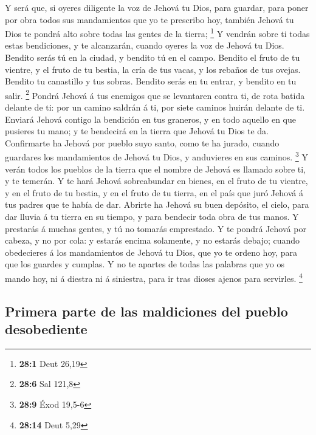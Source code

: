  Y será que, si oyeres diligente la voz de Jehová tu Dios,
para guardar, para poner por obra todos sus mandamientos que yo te
prescribo hoy, también Jehová tu Dios te pondrá alto sobre todas las
gentes de la tierra; \footnote{\textbf{28:1} Deut 26,19} 
Y vendrán sobre ti todas estas bendiciones, y te alcanzarán, cuando
oyeres la voz de Jehová tu Dios.  Bendito serás tú en la
ciudad, y bendito tú en el campo.  Bendito el fruto de tu
vientre, y el fruto de tu bestia, la cría de tus vacas, y los rebaños de
tus ovejas.  Bendito tu canastillo y tus sobras.
 Bendito serás en tu entrar, y bendito en tu salir.
\footnote{\textbf{28:6} Sal 121,8}  Pondrá Jehová á tus
enemigos que se levantaren contra ti, de rota batida delante de ti: por
un camino saldrán á ti, por siete caminos huirán delante de ti.
 Enviará Jehová contigo la bendición en tus graneros, y en
todo aquello en que pusieres tu mano; y te bendecirá en la tierra que
Jehová tu Dios te da.  Confirmarte ha Jehová por pueblo
suyo santo, como te ha jurado, cuando guardares los mandamientos de
Jehová tu Dios, y anduvieres en sus caminos. \footnote{\textbf{28:9}
  Éxod 19,5-6}  Y verán todos los pueblos de la tierra
que el nombre de Jehová es llamado sobre ti, y te temerán.
 Y te hará Jehová sobreabundar en bienes, en el fruto de
tu vientre, y en el fruto de tu bestia, y en el fruto de tu tierra, en
el país que juró Jehová á tus padres que te había de dar.
 Abrirte ha Jehová su buen depósito, el cielo, para dar
lluvia á tu tierra en su tiempo, y para bendecir toda obra de tus manos.
Y prestarás á muchas gentes, y tú no tomarás emprestado. 
Y te pondrá Jehová por cabeza, y no por cola: y estarás encima
solamente, y no estarás debajo; cuando obedecieres á los mandamientos de
Jehová tu Dios, que yo te ordeno hoy, para que los guardes y cumplas.
 Y no te apartes de todas las palabras que yo os mando
hoy, ni á diestra ni á siniestra, para ir tras dioses ajenos para
servirles. \footnote{\textbf{28:14} Deut 5,29}

\hypertarget{primera-parte-de-las-maldiciones-del-pueblo-desobediente}{%
\subsection{Primera parte de las maldiciones del pueblo
desobediente}\label{primera-parte-de-las-maldiciones-del-pueblo-desobediente}}

